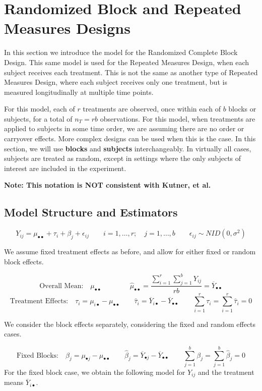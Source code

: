 \documentclass[
]{book}
\begin{document}
\section{Randomized Block and Repeated Measures
Designs}\label{randomized-block-and-repeated-measures-designs}

In this section we introduce the model for the Randomized Complete Block
Design. This same model is used for the Repeated Measures Design, when
each subject receives each treatment. This is not the same as another
type of Repeated Measures Design, where each subject receives only one
treatment, but is measured longitudinally at multiple time points.

For this model, each of \(r\) treatments are observed, once within each
of \(b\) blocks or subjects, for a total of \(n_T=rb\) observations. For
this model, when treatments are applied to subjects in some time order,
we are assuming there are no order or carryover effects. More complex
designs can be used when this is the case. In this section, we will use
\textbf{blocks} and \textbf{subjects} interchangeably. In virtually all
cases, subjects are treated as random, except in settings where the only
subjects of interest are included in the experiment.

\textbf{Note: This notation is NOT consistent with Kutner, et al.}

\subsection{Model Structure and
Estimators}\label{model-structure-and-estimators}

\[
Y_{ij} = \mu_{\bullet\bullet} + \tau_i + \beta_j + \epsilon_{ij} \qquad
i=1,\ldots,r; \quad j=1,\ldots,b \qquad \epsilon_{ij} \sim NID\left(0,\sigma^2\right)
\]

We assume fixed treatment effects as before, and allow for either fixed
or random block effects.

\[
\mbox{Overall Mean:} \quad  \mu_{\bullet\bullet}  \qquad \qquad
\hat{\mu}_{\bullet\bullet} = \frac{\sum_{i=1}^r\sum_{j=1}^bY_{ij}}{rb} = 
\overline{Y}_{\bullet\bullet}
\] \[
\mbox{Treatment Effects:} \quad \tau_i = \mu_{i\bullet}-\mu_{\bullet\bullet}
\qquad \hat{\tau}_i = \overline{Y}_{i\bullet} - \overline{Y}_{\bullet\bullet}
\qquad  \sum_{i=1}^r\tau_i=\sum_{i=1}^r\hat{\tau}_i=0
\]

We consider the block effects separately, considering the fixed and
random effects cases.

\[
\mbox{Fixed Blocks:} \quad \beta_j=\mu_{\bullet j}-\mu_{\bullet\bullet}
\qquad \hat{\beta}_j = \overline{Y}_{\bullet j} - \overline{Y}_{\bullet\bullet}
\qquad  \sum_{j=1}^b\beta_j=\sum_{j=1}^b\hat{\beta}_j=0
\] For the fixed block case, we obtain the following model for
\(Y_{ij}\) and the treatment means \(\overline{Y}_{i\bullet}\).
\end{document}
